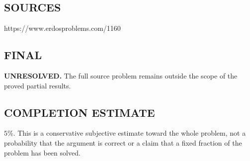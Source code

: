 \subsection*{SOURCES}
https://www.erdosproblems.com/1160

\subsection*{FINAL}
\textbf{UNRESOLVED.} The full source problem remains outside the scope of the proved partial results.

\subsection*{COMPLETION ESTIMATE}
$5\%$. This is a conservative subjective estimate toward the whole problem, not a probability that the argument is correct or a claim that a fixed fraction of the problem has been solved.

